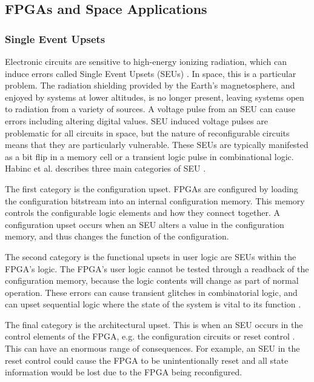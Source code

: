 \documentclass[12pt]{article}
\begin{document}
\subsection{FPGAs and Space Applications}
\label{sec:Background-FPGAsAndSpaceApplications}
\vspace{-12pt}

\subsubsection{Single Event Upsets}
\label{sec:Background-FPGAsAndSpaceApplications-SEUs}
\vspace{-12pt}

Electronic circuits are sensitive to high-energy ionizing radiation, which can induce errors called Single Event Upsets (SEUs) \cite{SeuTutorial}. In space, this is a particular problem. The radiation shielding provided by the Earth's magnetosphere, and enjoyed by systems at lower altitudes, is no longer present, leaving systems open to radiation from a  variety of sources. A voltage pulse from an SEU can cause errors including altering digital values. SEU induced voltage pulses are problematic for all circuits in space, but the nature of reconfigurable circuits means that they are particularly vulnerable. These SEUs are typically manifested as a bit flip in a memory cell or a transient logic pulse in combinational logic. Habinc et al. describes three main categories of SEU \cite{SuitabilityGaisler}.

The first category is the configuration upset. FPGAs are configured by loading the configuration bitstream into an internal configuration memory. This memory controls the configurable logic elements and how they connect together. A configuration upset occurs when an SEU alters a value in the configuration memory, and thus changes the function of the configuration. 

The second category is the functional upsets in user logic are SEUs within the FPGA's logic. The FPGA's user logic cannot be tested through a readback of the configuration memory, because the logic contents will change as part of normal operation. These errors can cause transient glitches in combinatorial logic, and can upset sequential logic where the state of the system is vital to its function \cite{FTripleMR}.

The final category is the architectural upset. This is when an SEU occurs in the control elements of the FPGA, e.g. the configuration circuits or reset control \cite{SuitabilityGaisler}. This can have an enormous range of consequences. For example, an SEU in the reset control could cause the FPGA to be unintentionally reset and all state information would be lost due to the FPGA being reconfigured.
\end{document}
